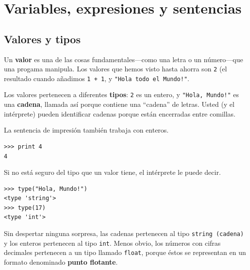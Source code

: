 

\chapter{Variables, expresiones y sentencias}

\section{Valores y tipos}


Un {\bf valor} es una de las cosas fundamentales---como una letra o un 
número---que una progama manipula.  Los valores que hemos visto hasta ahorra
son \texttt{2} (el resultado cuando añadimos \texttt{1 + 1}, y
{\verb+"Hola todo el Mundo!"+}.

Los valores pertenecen a diferentes {\bf tipos}:
\texttt{2} es un entero, y {\verb+"Hola, Mundo!"+} es una {\bf cadena},
llamada así porque contiene una ``cadena'' de letras.
Usted (y el intérprete) pueden identificar cadenas porque  están
encerradas entre comillas.

La sentencia de impresión también trabaja con enteros.

\beforeverb
\begin{verbatim}
>>> print 4
4
\end{verbatim}
\afterverb
%
Si no está seguro del  tipo que un valor tiene,
el intérprete le puede decir.

\beforeverb
\begin{verbatim}
>>> type("Hola, Mundo!")
<type 'string'>
>>> type(17)
<type 'int'>
\end{verbatim}
\afterverb
%
Sin despertar ninguna sorpresa, las cadenas pertenecen al tipo \texttt{string (cadena)} y los enteros pertenecen al tipo \texttt{int}.  Menos obvio, los números con cifras decimales
pertenecen a un tipo llamado \texttt{float},
porque éstos se representan en un formato denominado
 {\bf punto flotante}.

